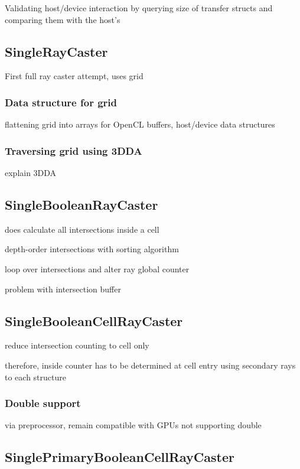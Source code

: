 Validating host/device interaction by querying size of transfer structs and comparing them with the host's

\subsection{SingleRayCaster}

First full ray caster attempt, uses grid

\subsubsection{Data structure for grid}

flattening grid into arrays for OpenCL buffers, host/device data structures

\subsubsection{Traversing grid using 3DDA}

explain 3DDA

\subsection{SingleBooleanRayCaster}

does calculate all intersections inside a cell

depth-order intersections with sorting algorithm

loop over intersections and alter ray global counter

problem with intersection buffer

\subsection{SingleBooleanCellRayCaster}

reduce intersection counting to cell only

therefore, inside counter has to be determined at cell entry using secondary rays to each structure

\subsubsection{Double support}

via preprocessor, remain compatible with GPUs not supporting double

\subsection{SinglePrimaryBooleanCellRayCaster}

